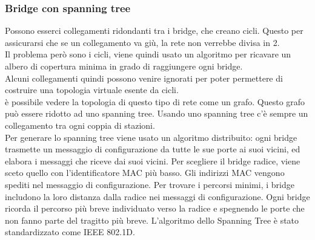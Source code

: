 \documentclass{article}
\begin{document}
\subsubsection{Bridge con spanning tree}
Possono esserci collegamenti ridondanti tra i bridge, che creano cicli. Questo per assicurarsi che se un collegamento va giù, la rete non verrebbe divisa in 2. \\
Il problema però sono i cicli, viene quindi usato un algoritmo per ricavare un albero di copertura minima in grado di raggiungere ogni bridge.\\
Alcuni collegamenti quindi possono venire ignorati per poter permettere di costruire una topologia virtuale esente da cicli.\\
è possibile vedere la topologia di questo tipo di rete come un grafo. Questo grafo può essere ridotto ad uno spanning tree. Usando uno spanning tree c'è sempre un collegamento tra ogni coppia di stazioni.\\
Per generare lo spanning tree viene usato un algoritmo distribuito: ogni bridge trasmette un messaggio di configurazione da tutte le sue porte ai suoi vicini, ed elabora i messaggi che riceve dai suoi vicini.
Per scegliere il bridge radice, viene sceto quello con l'identificatore MAC più basso. Gli indirizzi MAC vengono spediti nel messaggio di configurazione. 
Per trovare i percorsi minimi, i bridge includono la loro distanza dalla radice nei messaggi di configurazione. Ogni bridge ricorda il percorso più breve individuato verso la radice e spegnendo le porte che non fanno parte del tragitto più breve.
L'algoritmo dello Spanning Tree è stato standardizzato come IEEE 802.1D.
\end{document}
